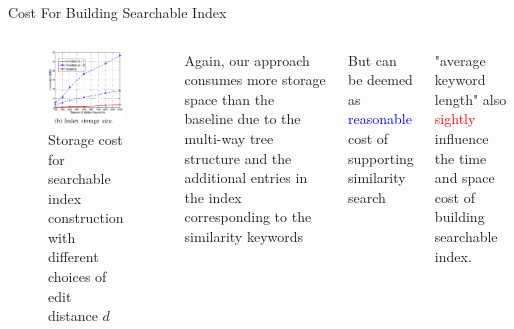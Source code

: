 \documentclass{beamer}
\begin{document}
\begin{frame}{Cost For Building Searchable Index}
	\begin{columns}
	\begin{figure}
		\includegraphics[width=\textwidth]{subfig3.jpg}
		\caption{Storage cost for searchable index construction with different choices of edit distance $d$}	
	\end{figure}
	\begin{exampleblock}{}
		Again, our approach consumes more storage space than the baseline due to the \textcolor[rgb]{0.1,0.7,0.2}{multi-way tree structure} and the \textcolor[rgb]{0.1,0.7,0.2}{additional entries} in the index corresponding to the similarity keywords
	\end{exampleblock}
	\begin{block}{}
		But can be deemed as \textcolor{blue}{reasonable} cost of supporting similarity search
	\end{block}
	\begin{alertblock}{}
		"average keyword length" also \textcolor{red}{sightly} influence the time and space cost of building searchable index.
	\end{alertblock}
	\end{columns}
\end{frame}
\end{document}
